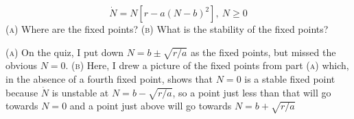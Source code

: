 \documentclass{article}
\begin{document}
\[
\dot{N} = N\left[r - a(N - b)^2\right], ~ N \geq 0
\]
\textsc{(a)} Where are the fixed points?
\newline\textsc{(b)} What is the stability of the fixed points?

\hangindent=20pt
\vspace{20pt}
\newline\textsc{(a)} On the quiz, I put down $N = b \pm \sqrt{r/a}$ as the fixed points, but missed the obvious $N = 0$.
\newline\textsc{(b)} Here, I drew a picture of the fixed points from part \textsc{(a)} which, in the absence of a fourth fixed point, shows that $N = 0$ is a stable fixed point because $\dot{N}$ is unstable at $N = b - \sqrt{r/a}$, so a point just less than that will go towards $N = 0$ and a point just above will go towards $N = b + \sqrt{r/a}$
\end{document}
